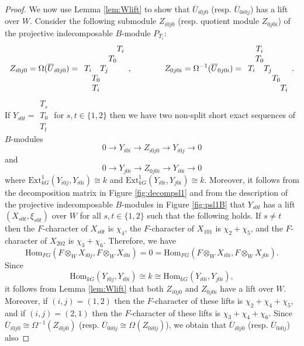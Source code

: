 \documentclass{amsart}
\theoremstyle{plain}
\theoremstyle{definition}
\theoremstyle{remark}
\begin{document}
\begin{proof}
We now use Lemma \ref{lem:Wlift} to show that $\overline{U}_{i0j0}$ (resp. $\overline{U}_{0i0j}$)
has a lift over $W$. Consider the following submodule $Z_{i0j0}$ (resp. quotient module
$Z_{0j0i}$) of the projective indecomposable $B$-module $P_{T_i}$:
$$Z_{i0j0}=\Omega(\overline{U}_{i0j0})=
\begin{array}{c@{}c@{}c@{}c@{}c} &&&&T_i\\&&&T_0\\T_i&&T_j\\&T_0\\&T_i
\end{array},\qquad \qquad Z_{0j0i}=\Omega^{-1}(\overline{U}_{0j0i})=
\begin{array}{c@{}c@{}c@{}c@{}c}&T_i\\&T_0\\T_i&&T_j\\&&&T_0\\
&&&&T_i\end{array}.$$
If $Y_{s0t}=\begin{array}{c}T_s\\T_0\\T_t\end{array}$ for $s,t\in\{1,2\}$ then
we have two non-split short exact sequences of $B$-modules
$$0\to Y_{i0i}\to Z_{i0j0}\to Y_{i0j}\to 0$$
and 
$$0\to Y_{j0i}\to Z_{0j0i}\to Y_{i0i}\to 0$$
where $\mathrm{Ext}^1_{kG}(Y_{i0j},Y_{i0i})\cong k$ and $\mathrm{Ext}^1_{kG}(Y_{i0i},Y_{j0i})\cong k$.
Moreover, it follows from the decomposition matrix in Figure \ref{fig:decompsl1} and from the
description of the projective indecomposable $B$-modules in Figure \ref{fig:psl1B} that $Y_{s0t}$
has a lift $(X_{s0t},\xi_{s0t})$ over $W$ for all $s,t\in\{1,2\}$ such that the following holds. 
If $s\neq t$ then the $F$-character of $X_{s0t}$ is $\chi_4$, the $F$-character
of $X_{101}$ is $\chi_2+\chi_5$, and the $F$-character of $X_{202}$ is 
$\chi_3+\chi_6$. Therefore, we have
$$\mathrm{Hom}_{FG}(F\otimes_W X_{i0j},F\otimes_W X_{i0i})=0=
\mathrm{Hom}_{FG}(F\otimes_W X_{i0i},F\otimes_W X_{j0i}).$$
Since 
$$\mathrm{Hom}_{kG}(Y_{i0j},Y_{i0i})\cong k\cong
\mathrm{Hom}_{kG}(Y_{i0i},Y_{j0i}),$$
it follows from Lemma \ref{lem:Wlift} that both $Z_{i0j0}$ and $Z_{0j0i}$ have  a lift over $W$.
Moreover, if $(i,j)=(1,2)$ then the $F$-character of these lifts is $\chi_2+\chi_4+\chi_5$, and if
$(i,j)=(2,1)$ then the $F$-character of these lifts is $\chi_3+\chi_4+\chi_6$.
Since $\overline{U}_{i0j0}\cong \Omega^{-1}(Z_{i0j0})$ (resp. $\overline{U}_{0i0j}\cong \Omega(
Z_{0i0j})$), we obtain that  $\overline{U}_{i0j0}$ (resp. $\overline{U}_{0i0j}$) also

\end{proof}
\end{document}
